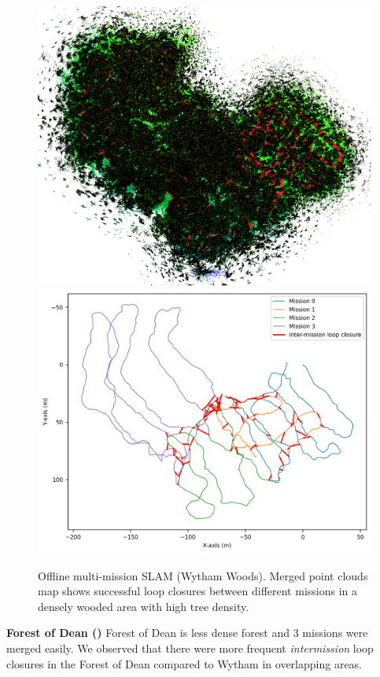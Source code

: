 \begin{figure}[htbp]
  \centering
  \includegraphics[width=0.9\columnwidth]{pics/exp_3_offline_wytham_pcd.png}
  \includegraphics[width=0.9\columnwidth]{pics/exp_3_1_multimission_slam_wytham_ratio.png}
  \caption{Offline multi-mission SLAM (Wytham Woods). Merged point clouds map shows successful loop closures between different missions in a densely wooded area with high tree density.}
  \label{fig:exp_multi_mission_wytham}
\end{figure}
\newline
\textbf{Forest of Dean ()}\hspace{0.5em} Forest of Dean is less dense forest and 3 missions were merged easily. We observed that there were more frequent \emph{intermission} loop closures in the Forest of Dean compared to Wytham in overlapping areas. \\

